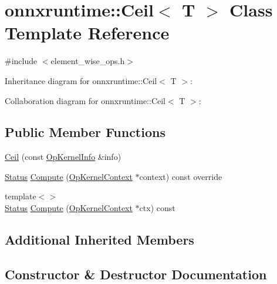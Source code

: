\hypertarget{classonnxruntime_1_1Ceil}{}\section{onnxruntime\+:\+:Ceil$<$ T $>$ Class Template Reference}
\label{classonnxruntime_1_1Ceil}


{\ttfamily \#include $<$element\+\_\+wise\+\_\+ops.\+h$>$}



Inheritance diagram for onnxruntime\+:\+:Ceil$<$ T $>$\+:


Collaboration diagram for onnxruntime\+:\+:Ceil$<$ T $>$\+:
\subsection*{Public Member Functions}
\begin{DoxyCompactItemize}
\item 
\mbox{\hyperlink{classonnxruntime_1_1Ceil_a70cd330550b642ea25f410a8536e80bd}{Ceil}} (const \mbox{\hyperlink{classonnxruntime_1_1OpKernelInfo}{Op\+Kernel\+Info}} \&info)
\item 
\mbox{\hyperlink{classonnxruntime_1_1common_1_1Status}{Status}} \mbox{\hyperlink{classonnxruntime_1_1Ceil_af14a32b94fd6b49f01aec57f81a38407}{Compute}} (\mbox{\hyperlink{classonnxruntime_1_1OpKernelContext}{Op\+Kernel\+Context}} $\ast$context) const override
\item 
{\footnotesize template$<$$>$ }\\\mbox{\hyperlink{classonnxruntime_1_1common_1_1Status}{Status}} \mbox{\hyperlink{classonnxruntime_1_1Ceil_abe760048b39655fdc12476f4daed6478}{Compute}} (\mbox{\hyperlink{classonnxruntime_1_1OpKernelContext}{Op\+Kernel\+Context}} $\ast$ctx) const
\end{DoxyCompactItemize}
\subsection*{Additional Inherited Members}


\subsection{Constructor \& Destructor Documentation}
\mbox{\label{classonnxruntime_1_1Ceil_a70cd330550b642ea25f410a8536e80bd}} 
